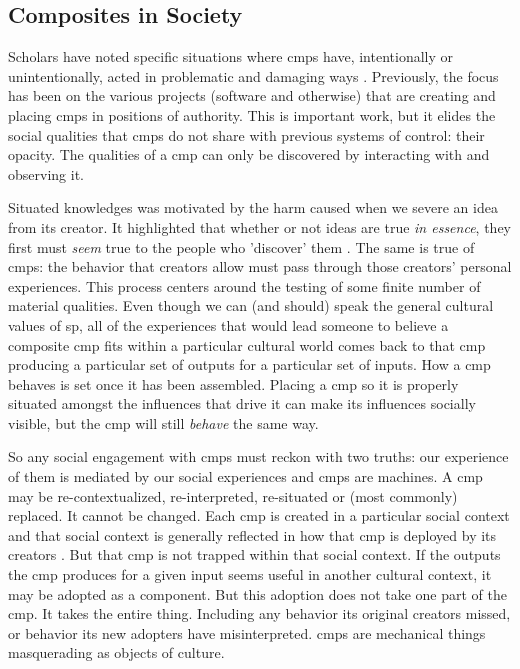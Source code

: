 \documentclass[a4paper,man,natbib,floatsintext]{apa6}
\begin{document}

  \subsection{Composites in Society}
  Scholars have noted specific situations where \glspl{cmp} have, intentionally or unintentionally, acted in problematic and damaging ways \citep{Cheney-Lippold2018-lw,Eubanks2018-hc,Schull2012-nc}. Previously, the focus has been on the various projects (software and otherwise) that are creating and placing \glspl{cmp} in positions of authority. This is important work, but it elides the social qualities that \glspl{cmp} do not share with previous systems of control: their opacity. The qualities of a \gls{cmp} can only be discovered by interacting with and observing it. 

  Situated knowledges was motivated by the harm caused when we severe an idea from its creator. It highlighted that whether or not ideas are true \textit{in essence}, they first must \textit{seem} true to the people who 'discover' them \citep{Harding1992-od,Haraway1988-nh}. The same is true of \glspl{cmp}: the behavior that creators allow must pass through those creators' personal experiences. This process centers around the testing of some finite number of material qualities. Even though we can (and should) speak the general cultural values of \gls{sp}, all of the experiences that would lead someone to believe a composite \gls{cmp} fits within a particular cultural world comes back to that \gls{cmp} producing a particular set of outputs for a particular set of inputs. How a \gls{cmp} behaves is set once it has been assembled. Placing a \gls{cmp} so it is properly situated amongst the influences that drive it can make its influences socially visible, but the \gls{cmp} will still \textit{behave} the same way. 

  So any social engagement with \glspl{cmp} must reckon with two truths: our experience of them is mediated by our social experiences and \glspl{cmp} are machines. A \gls{cmp} may be re-contextualized, re-interpreted, re-situated or (most commonly) replaced. It cannot be changed. Each \gls{cmp} is created in a particular social context and that social context is generally reflected in how that \gls{cmp} is deployed by its creators \citep{Mackenzie2006-hb}. But that \gls{cmp} is not trapped within that social context. If the outputs the \gls{cmp} produces for a given input seems useful in another cultural context, it may be adopted as a component. But this adoption does not take one part of the \gls{cmp}. It takes the entire thing. Including any behavior its original creators missed, or behavior its new adopters have misinterpreted. \Glspl{cmp} are mechanical things masquerading as objects of culture.
\end{document}
